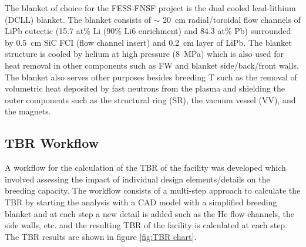 \documentclass[12pt, letterpaper]{elsarticle}
\begin{document}
The blanket of choice for the FESS-FNSF project is the dual cooled lead-lithium (DCLL) \cite{ref_12} blanket. The blanket consists of $\sim$ \SI{20}{cm} radial/toroidal flow channels of LiPb eutectic (15.7 at\% Li (90\% Li6 enrichment) and 84.3 at\% Pb) surrounded by \SI{0.5}{cm} SiC FCI (flow channel insert) and \SI{0.2}{cm} layer of LiPb. The blanket structure is cooled by helium at high pressure (\SI{8}{MPa}) which is also used for heat removal in other components such as FW and blanket side/back/front walls. The blanket also serves other purposes besides breeding T such as the removal of volumetric heat deposited by fast neutrons from the plasma and shielding the outer components such as the structural ring (SR), the vacuum vessel (VV), and the magnets.

\subsection{TBR Workflow} \label{TBR Workflow}
A workflow for the calculation of the TBR of the facility was developed which involved assessing the impact of individual design elements/details on the breeding capacity. The workflow consists of a multi-step approach to calculate the TBR by starting the analysis with a CAD model with a simplified breeding blanket and at each step a new detail is added such as the He flow channels, the side walls, etc. and the resulting TBR of the facility is calculated at each step. The TBR results are shown in figure \ref{fig:TBR chart}. \vspace{5mm}
\end{document}
